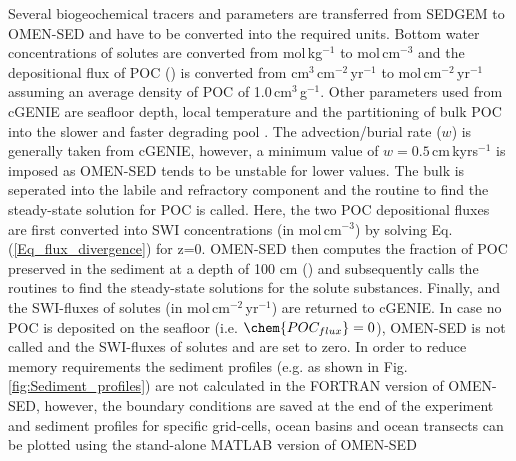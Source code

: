 \documentclass[gmd, manuscript]{copernicus}
\begin{document}
Several biogeochemical tracers and parameters are transferred from SEDGEM to OMEN-SED and have to be converted into the required units. 
Bottom water concentrations of solutes are converted from mol\,kg$^{-1}$ to mol\,cm$^{-3}$ and the depositional flux of POC () is converted from cm$^{3}$\,cm$^{-2}$\,yr$^{-1}$ 
to mol\,cm$^{-2}$\,yr$^{-1}$ assuming an average density of POC of 1.0\,cm$^{3}$\,g$^{-1}$.
Other parameters used from cGENIE are seafloor depth, local temperature and the partitioning of bulk POC into the slower and faster degrading pool 
\citep[as cGENIE represents a labile and a refractory POC fraction, see][]{ridgwell_marine_2007}. 
The advection/burial rate ($w$) is generally taken from cGENIE, however, a minimum value of $w=0.5$\,cm\,kyrs$^{-1}$ is imposed as OMEN-SED tends to be unstable for lower values. 
The bulk  is seperated into the labile and refractory component and the routine to find the steady-state solution for POC is called. 
Here, the two POC depositional fluxes are first converted into SWI concentrations (in mol\,cm$^{-3}$) by solving Eq. (\ref{Eq_flux_divergence}) for z=0. 
OMEN-SED then computes the fraction of POC preserved in the sediment at a depth of 100 cm () and subsequently calls the routines to find the steady-state solutions for the solute substances. 
Finally,  and the SWI-fluxes of solutes (in mol\,cm$^{-2}$\,yr$^{-1}$) are returned to cGENIE. 
In case no POC is deposited on the seafloor (i.e. $\chem{POC_{flux}}=0$), OMEN-SED is not called and the SWI-fluxes of solutes and  are set to zero. 
In order to reduce memory requirements the sediment profiles (e.g. as shown in Fig. \ref{fig:Sediment_profiles}) are not calculated in the FORTRAN version of OMEN-SED, 
however, the boundary conditions are saved at the end of the experiment and sediment profiles for specific grid-cells, ocean basins and ocean transects can be plotted 
using the stand-alone MATLAB version of OMEN-SED
\end{document}

